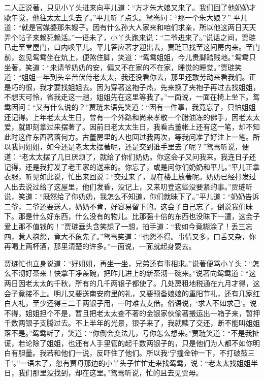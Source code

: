 \begin{parag}


    二人正说著，只见小丫头进来向平儿道：“方才朱大娘又来了。我们回了他奶奶才歇午觉，他往太太上头去了。”平儿听了点头。鸳鸯问：“那一个朱大娘？” 平儿道：“就是官媒婆那朱嫂子。因有什么孙大人家来和咱们求亲，所以他这两日天天弄个帖子来赖死赖活。”一语未了，小丫头跑来说：“二爷进来了。”说话之间，贾琏已走至堂屋门，口内唤平儿。平儿答应著才迎出去，贾琏已找至这间房内来。至门前，忽见鸳鸯坐在炕上，便煞住脚，笑道：“鸳鸯姐姐，今儿贵脚踏贱地。”鸳鸯只坐著，笑道：“来请爷奶奶的安，偏又不在家的不在家，睡觉的睡觉。”贾琏笑道：“姐姐一年到头辛苦伏侍老太太，我还没看你去，那里还敢劳动来看我们。正是巧的很，我才要找姐姐去。因为穿著这袍子热，先来换了夹袍子再过去找姐姐，不想天可怜，省我走这一趟，姐姐先在这里等我了。”一面说，一面在椅上坐下。鸳鸯因问：“又有什么说的？”贾琏未语先笑道：“因有一件事，我竟忘了，只怕姐姐还记得。上年老太太生日，曾有一个外路和尚来孝敬一个腊油冻的佛手，因老太太爱，就即刻拿过来摆著了。因前日老太太生日，我看古董帐上还有这一笔，却不知此时这件东西著落何方。古董房里的人也回过我两次，等我问准了好注上一笔。所以我问姐姐，如今还是老太太摆著呢，还是交到谁手里去了呢？”鸳鸯听说，便道：“老太太摆了几日厌烦了，就给了你们奶奶。你这会子又问我来。我连日子还记得，还是我打发了老王家的送来的。你忘了，或是问你们奶奶和平儿。”平儿正拿衣服，听见如此说，忙出来回说：“交过来了，现在楼上放著呢。奶奶已经打发过人出去说过给了这屋里，他们发昏，没记上，又来叨登这些没要紧的事。”贾琏听说，笑道：“既然给了你奶奶，我怎么不知道，你们就昧下了。”平儿道：“奶奶告诉二爷，二爷还要送人，奶奶不肯，好容易留下的。这会子自己忘了，倒说我们昧下。那是什么好东西，什么没有的物儿。比那强十倍的东西也没昧下一遭，这会子爱上那不值钱的！”贾琏垂头含笑想了一想，拍手道：“我如今竟糊涂了！丢三忘四，惹人抱怨，竟大不象先了。”鸳鸯笑道：“也怨不得。事情又多，口舌又杂，你再喝上两杯酒，那里清楚的许多。”一面说，一面就起身要去。
\end{parag}


\begin{parag}


    贾琏忙也立身说道：“好姐姐，再坐一坐，兄弟还有事相求。”说著便骂小丫头：“怎么不沏好茶来！快拿干净盖碗，把昨儿进上的新茶沏一碗来。”说著向鸳鸯道：“这两日因老太太的千秋，所有的几千两银子都使了。几处房租地税通在九月才得，这会子竟接不上。明儿又要送南安府里的礼，又要预备娘娘的重阳节礼，还有几家红白大礼，至少还得三二千两银子用，一时难去支借。俗语说，‘求人不如求己’。说不得，姐姐担个不是，暂且把老太太查不著的金银家伙偷著搬运出一箱子来，暂押千数两银子支腾过去。不上半年的光景，银子来了，我就赎了交还，断不能叫姐姐落不是。”鸳鸯听了，笑道：“你倒会变法儿，亏你怎么想来。”贾琏笑道：“不是我扯谎，若论除了姐姐，也还有人手里管的起千数两银子的，只是他们为人都不如你明白有胆量。我若和他们一说，反吓住了他们。所以我‘宁撞金钟一下，不打破鼓三千’。”一语未了，忽有贾母那边的小丫头子忙忙走来找鸳鸯，说：“老太太找姐姐半日，我们那里没找到，却在这里。”鸳鸯听说，忙的且去见贾母。
\end{parag}


